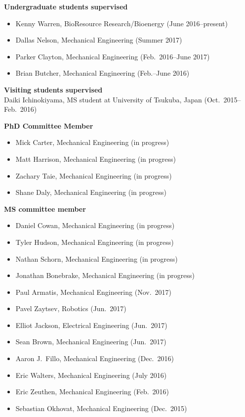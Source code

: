 \documentclass[margin,line,11pt]{res}
\begin{document}
\begin{resume}
\textbf{Undergraduate students supervised}
\begin{itemize}[leftmargin=*]
    \item Kenny Warren, BioResource Research\slash Bioenergy (June 2016--present)
    \item Dallas Nelson, Mechanical Engineering (Summer 2017)
    \item Parker Clayton, Mechanical Engineering (Feb.~2016--June 2017)
    \item Brian Butcher, Mechanical Engineering (Feb.--June 2016)
\end{itemize}

\textbf{Visiting students supervised} \\
Daiki Ichinokiyama, MS student at University of Tsukuba, Japan (Oct.~2015--Feb.~2016)

\textbf{PhD Committee Member}
\begin{itemize}[leftmargin=*]
    \item Mick Carter, Mechanical Engineering (in progress)
    \item Matt Harrison, Mechanical Engineering (in progress)
    \item Zachary Taie, Mechanical Engineering (in progress)
    \item Shane Daly, Mechanical Engineering (in progress)
\end{itemize}

\textbf{MS committee member}
\begin{itemize}[leftmargin=*]
    \item Daniel Cowan, Mechanical Engineering (in progress)
    \item Tyler Hudson, Mechanical Engineering (in progress)
    \item Nathan Schorn, Mechanical Engineering (in progress)
    \item Jonathan Bonebrake, Mechanical Engineering (in progress)
    \item Paul Armatis, Mechanical Engineering (Nov.~2017)
    \item Pavel Zaytsev, Robotics (Jun.~2017)
    \item Elliot Jackson, Electrical Engineering (Jun.~2017)
    \item Sean Brown, Mechanical Engineering (Jun.~2017)
    \item Aaron J.~Fillo, Mechanical Engineering (Dec.~2016)
    \item Eric Walters, Mechanical Engineering (July 2016)
    \item Eric Zeuthen, Mechanical Engineering (Feb.~2016)
    \item Sebastian Okhovat, Mechanical Engineering (Dec.~2015)
\end{itemize}


\end{resume}
\end{document}
